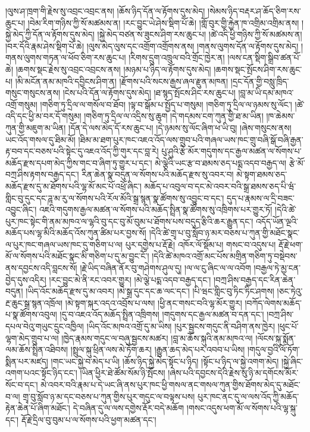 \documentclass{article}
\begin{document}
།ལུས་ཤ་ཁྲག་གི་རྗེས་སུ་འབྲང་འབྲང་ནས། །ཆོས་ཉིད་དོན་ལ་རྟོགས་དུས་མེད། །སེམས་ཉིད་བརྡར་ཤ་ཆོད་ཅིག་རས་ཆུང་པ། །བེམ་རིག་གཉིས་ཀྱི་སོ་མཚམས་ན། །རང་བྱུང་ཡེ་ཤེས་སྡིག་པོ་ཆེ། །གློ་བུར་གྱི་རྐྱེན་ཁ་འགྲིམ་འགྲིམ་ནས། །སྐྱེ་མེད་ཀྱི་དོན་ལ་རྟོགས་དུས་མེད། །སྐྱེ་མེད་བཙན་ས་ཟུངས་ཤིག་རས་ཆུང་པ། །ཚེ་འདི་ཕྱི་གཉིས་ཀྱི་སོ་མཚམས་ན། །བར་དོའི་རྣམ་ཤེས་སྡིག་པོ་ཆེ། །ལུས་མེད་ལུས་དང་འགྲོག་འགྲོགས་ནས། །གནས་ལུགས་དོན་ལ་རྟོགས་དུས་མེད། །གནས་ལུགས་གཏན་ལ་ཕོབ་ཅིག་རས་ཆུང་པ། །རིགས་དྲུག་འཁྲུལ་བའི་གྲོང་ཁྱེར་ན། །ལས་ངན་སྡིག་སྒྲིབ་ཚན་པོ་ཆེ། །ཆགས་སྡང་རྗེས་སུ་འབྲང་འབྲངས་ནས། །མཉམ་པ་ཉིད་ལ་རྟོགས་དུས་མེད། །ཆགས་སྡང་སྤོངས་ཤིག་རས་ཆུང་པ། །མི་མངོན་ནམ་མཁའི་དབྱིངས་ཤིག་ན། །རྫོགས་པའི་སངས་རྒྱས་ཞལ་རྫུན་མཁན། །དྲང་དོན་གྱི་བསླུ་ཁྲིད་གསུང་གསུངས་ནས། །ངེས་པའི་དོན་ལ་རྟོགས་དུས་མེད། །ཐ་སྙད་སྤོངས་ཤིང་རས་ཆུང་པ། །བླ་མ་ཡི་དམ་མཁའ་འགྲོ་གསུམ། །གཅིག་ཏུ་དྲིལ་ལ་གསོལ་བ་ཐོབ། །ལྟ་བ་སྒོམ་པ་སྤྱོད་པ་གསུམ། །གཅིག་ཏུ་དྲིལ་ལ་ཉམས་སུ་ལོང་། །ཚེ་འདི་དང་ཕྱི་མ་བར་དོ་གསུམ། །གཅིག་ཏུ་དྲིལ་ལ་འདྲིས་སུ་ཆུག །དེ་གདམས་ངག་ཀུན་གྱི་ཐ་མ་ཡིན། །ཁ་ཆེམས་ཀུན་གྱི་མཇུག་མ་ཡིན། །དོན་དེ་ལས་མེད་དོ་རས་ཆུང་པ། །དེ་ཉམས་སུ་ལོང་ཞིག་ཕ་ཡི་བུ། །ཞེས་གསུངས་ནས། ཡང་འོད་གསལ་དུ་ཐིམ་མོ། །ཐིམ་མ་ཐག་པུར་ཁང་འཇའ་འོད་ལས་གྲུབ་པའི་གཞལ་ཡས་ཁང་གྲུ་བཞི་སྒོ་བཞི་རྒྱན་རྟ་བབ་དང་བཅས་པའི་སྟེང་དུ་འཇའ་འོད་ཀྱི་གུར་དང་བླ་རེ། པུ་ཤུའི་རྩེ་མོར་གདུགས་དང་རྒྱལ་མཚན་ལ་སོགས་པ་མཆོད་རྫས་དཔག་མེད་ཀྱིས་གང་བ་ཞིག་ཏུ་གྱུར་པ་དང་། མེ་ལྕེའི་ཡང་རྩ་བ་ཐམས་ཅད་པདྨ་འདབ་བརྒྱད་ལ། རྩེ་མོ་བཀྲ་ཤིས་རྟགས་བརྒྱད་དང་། རིན་ཆེན་སྣ་བདུན་ལ་སོགས་པའི་མཆོད་རྫས་སུ་འབར་བ། མེ་སྟག་ཐམས་ཅད་མཆོད་རྫས་དུ་མ་ཐོགས་པའི་ལྷ་མོ་མང་པོ་འཕྲོ་ཞིང་། མཆོད་པ་འབུལ་བ་དང་མེ་འབར་བའི་སྒྲ་ཐམས་ཅད་པི་ཝཾ་གླིང་བུ་དུང་དང་ཌཱ་མ་རུ་ལ་སོགས་པའི་རོལ་མོའི་སྒྲ་སྙན་སྣ་ཚོགས་སུ་འབྱུང་བ་དང་། དུད་པ་རྣམས་ལ་དྲི་བཟང་འབྱུང་ཞིང་། འཇའི་གདུགས་རྒྱལ་མཚན་ལ་སོགས་པའི་མཆོད་སྤྲིན་སྣ་ཚོགས་སུ་འཁྲིགས་པར་གྱུར་ཏོ། །དེའི་ཚེ་པུར་ཁང་སྟེང་གི་ནམ་མཁའ་ལ་ལྷའི་བུ་དང་བུ་མོ་བུམ་པ་ཐོགས་པས་བདུད་རྩིའི་ཆར་རྒྱུན་དང་། འདོད་ཡོན་ལྔའི་མཆོད་པས་ལྷ་མིའི་མཆོད་འོས་ཀུན་ཚིམ་པར་བྱས་སོ། །དེའི་ཚེ་གྲྭ་པ་བུ་སློབ་ཉ་མར་བཅས་པ་ཀུན་གྱི་མཐོང་སྣང་ལ་པུར་ཁང་གཞལ་ཡས་ཁང་དུ་གཅིག་པ་ལ། པུར་དགྱེས་པ་རྡོ་རྗེ། འཁོར་ལོ་སྡོམ་པ། གསང་བ་འདུས་པ། རྡོ་རྗེ་ཕག་མོ་ལ་སོགས་པའི་མཐོང་སྣང་མི་གཅིག་པ་དུ་མ་བྱུང་ངོ་། །དེའི་ཚེ་མཁའ་འགྲོ་མང་པོས་མགྲིན་གཅིག་ཏུ་བསྡེབས་ནས་དབྱངས་འདི་བླངས་སོ། །རྗེ་ཡིད་བཞིན་ནོར་བུ་གཤེགས་ཤུལ་དུ། །ལ་ལ་ངུ་ཞིང་ལ་ལ་འབོག །བརྒྱལ་ཏེ་མྱ་ངན་བྱེད་དུས་འདིར། །རང་བྱུང་མེ་ནི་རང་འབར་གྱུར། །མེ་ལྕེ་པདྨ་འདབ་བརྒྱད་དང་། །བཀྲ་ཤིས་བརྒྱད་དང་རིན་ཆེན་བདུན། །ཡིད་འོང་མཆོད་རྫས་དུ་མ་འབར། །མེ་སྒྲ་དུང་དང་ཆ་ལང་དང་། །པི་ཝང་གླིང་བུ་ཏིང་ཏིང་ཤགས། །ཅང་ཏེའུ་རྔ་ཆུང་སྒྲ་སྙན་འཁྲོལ། །མེ་སྟག་སྐར་འདའ་འབྲོས་པ་ལས། །ཕྱི་ནང་གསང་བའི་ལྷ་མོར་གྱུར། །བཀོད་ལེགས་མཆོད་པ་སྣ་ཚོགས་འབུལ། །དུ་བ་འཇའ་འོད་མཆོད་སྤྲིན་འཁྲིགས། །གདུགས་དང་རྒྱལ་མཚན་བ་དན་དང་། །བཀྲ་ཤིས་དཔལ་བེའུ་གཡུང་དྲུང་འཁྱིལ། །ཡིད་འོང་མཁའ་འགྲོ་དུ་མ་ཡིས། །པུར་སྦྱངས་གདུང་ནི་བཤིག་ནས་ཁྱེར། །ཕུང་པོ་ལྷག་མེད་གྲུབ་པ་ལ། །ཁྱེད་རྣམས་གདུང་ལ་བཞུ་སྦྱངས་མཚར། །བླ་མ་ཆོས་སྐུའི་ནམ་མཁའ་ལ། །ལོངས་སྐུ་སྨོན་ལམ་ཆོས་སྤྲིན་འཐིབས། །སྤྲུལ་སྐུ་ཕྲིན་ལས་མེ་ཏོག་ཆར། །རྒྱུན་ཆད་མེད་པར་འབབ་པ་ཡིས། །གདུལ་བྱའི་ལོ་ཏོག་སྨིན་པར་མཛད། །གང་ཡང་སྐྱེ་བ་མེད་པ་ཡི། །ཆོས་ཉིད་སྐྱེ་མེད་སྟོང་པ་ཉིད། །སྟོང་པ་ཉིད་ལ་སྐྱེ་འགག་མེད། །སྐྱེ་ཞིང་འགག་པའང་སྟོང་ཉིད་ངང་། །ཡིན་ཕྱིར་ཐེ་ཚོམ་སོམ་ཉི་སྤོངས། །ཞེས་པའི་དབྱངས་དེའི་རྗེས་སུ་ཉི་མ་དགོངས་མོར་སོང་བ་དང་། མེ་འབར་བའི་རྣམ་པ་དེ་ཡང་ཞི་ནས་པུར་ཁང་ཕྱི་གསལ་ནང་གསལ་ཀུན་གྱིས་ཐོགས་མེད་དུ་མཐོང་བ་ལ། གྲྭ་བུ་སློབ་ཉ་མ་དང་བཅས་པ་ཀུན་གྱིས་པུར་གདུང་ལ་བལྟས་པས། པུར་ཁང་ནང་དུ་ལ་ལས་འོད་ཀྱི་མཆོད་རྟེན་ཆེན་པོ་ཞིག་མཐོང་། དེ་བཞིན་དུ་ལ་ལས་དགྱེས་རྡོར་བདེ་མཆོག །གསང་འདུས་ཕག་མོ་ལ་སོགས་པའི་ལྷ་སྐུ་དང་། རྡོ་རྗེ་དྲིལ་བུ་བུམ་པ་ལ་སོགས་པའི་ཕྱག་མཚན་དང་། 
\end{document}
